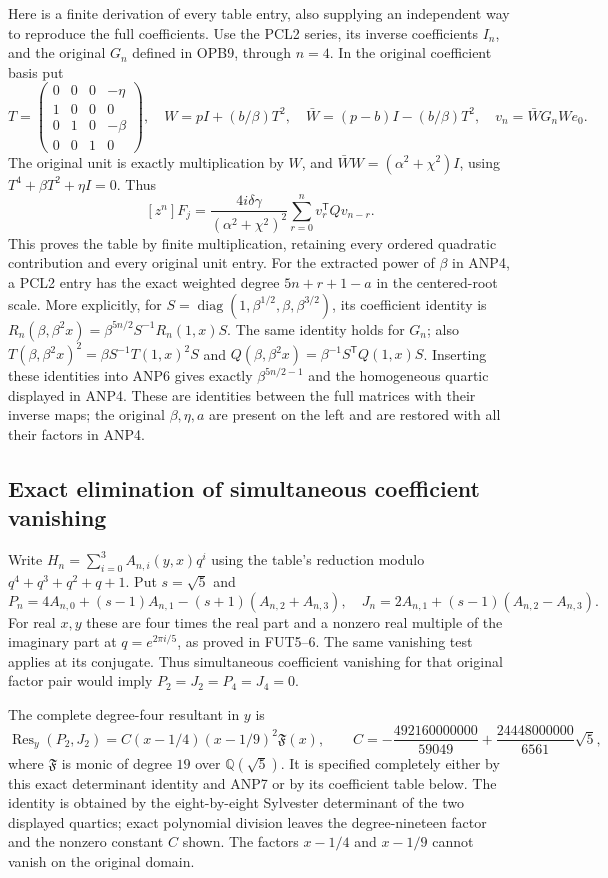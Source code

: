 \documentclass[11pt]{article}
\begin{document}
Here is a finite derivation of every table entry, also supplying an
independent way to reproduce the full coefficients. Use the PCL2
series, its inverse coefficients $I_n$, and the original $G_n$
defined in OPB9, through $n=4$. In the original coefficient basis put
\[
 T=\begin{pmatrix}0&0&0&-\eta\\1&0&0&0\\0&1&0&-\beta\\0&0&1&0\end{pmatrix},
 \quad W=pI+(b/\beta)T^2,\quad
 \bar W=(p-b)I-(b/\beta)T^2,
 \quad v_n=\bar W G_n W e_0.
 \tag{ANP5}
\]
The original unit is exactly multiplication by $W$, and
$\bar WW=(\alpha^2+\chi^2)I$, using
$T^4+\beta T^2+\eta I=0$. Thus
\[
 [z^n]F_j=
 \frac{4i\delta\gamma}{(\alpha^2+\chi^2)^2}
              \sum_{r=0}^n v_r^{\mathsf T}Qv_{n-r}.
 \tag{ANP6}
\]
This proves the table by finite multiplication, retaining every
ordered quadratic contribution and every original unit entry.
For the extracted power of $\beta$ in ANP4, a PCL2 entry has
the exact weighted degree $5n+r+1-a$ in the centered-root scale.
More explicitly, for $S=\operatorname{diag}(1,\beta^{1/2},\beta,\beta^{3/2})$,
its coefficient identity is
$R_n(\beta,\beta^2x)=\beta^{5n/2}S^{-1}R_n(1,x)S$.
The same identity holds for $G_n$; also
$T(\beta,\beta^2x)^2=\beta S^{-1}T(1,x)^2S$ and
$Q(\beta,\beta^2x)=\beta^{-1}S^{\mathsf T}Q(1,x)S$.
Inserting these identities into ANP6 gives exactly
$\beta^{5n/2-1}$ and the homogeneous quartic displayed in ANP4.
These are identities between the full matrices with their inverse
maps; the original $\beta,\eta,a$ are present on the left and
are restored with all their factors in ANP4.

\subsection{Exact elimination of simultaneous coefficient vanishing}
Write $H_n=\sum_{i=0}^3A_{n,i}(y,x)q^i$ using the table's
reduction modulo $q^4+q^3+q^2+q+1$. Put $s=\sqrt5$ and
\[
 P_n=4A_{n,0}+(s-1)A_{n,1}-(s+1)(A_{n,2}+A_{n,3}),
 \quad
 J_n=2A_{n,1}+(s-1)(A_{n,2}-A_{n,3}).
 \tag{ANP7}
\]
For real $x,y$ these are four times the real part and a nonzero
real multiple of the imaginary part at $q=e^{2\pi i/5}$,
as proved in FUT5--6. The same vanishing test applies at its conjugate.
Thus simultaneous coefficient vanishing for that original factor pair
would imply
$P_2=J_2=P_4=J_4=0$.

The complete degree-four resultant in $y$ is
\[
 \operatorname{Res}_y(P_2,J_2)
 =C(x-1/4)(x-1/9)^2\mathfrak F(x),\qquad
 C=-\frac{492160000000}{59049}
      +\frac{24448000000}{6561}\sqrt5,
 \tag{ANP8}
\]
where $\mathfrak F$ is monic of degree $19$ over $\mathbb Q(\sqrt5)$.
It is specified completely either by this exact determinant identity
and ANP7 or by its coefficient table below.
The identity is obtained by the eight-by-eight Sylvester determinant
of the two displayed quartics; exact polynomial division leaves the
degree-nineteen factor and the nonzero constant $C$ shown.
The factors $x-1/4$ and $x-1/9$ cannot vanish on the original domain.
\end{document}
